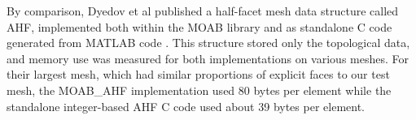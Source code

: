 \documentclass{article}
\begin{document}
By comparison, Dyedov et al published a half-facet mesh data structure
called AHF,
implemented both within the MOAB library and as standalone C code
generated from MATLAB code \cite{dyedov2014ahf}.
This structure stored only the topological data, and memory use
was measured for both implementations on various meshes.
For their largest mesh, which had similar proportions of explicit
faces to our test mesh, the MOAB\_AHF implementation used 80 bytes
per element while the standalone integer-based AHF C code used about
39 bytes per element.

{}

\end{document}
